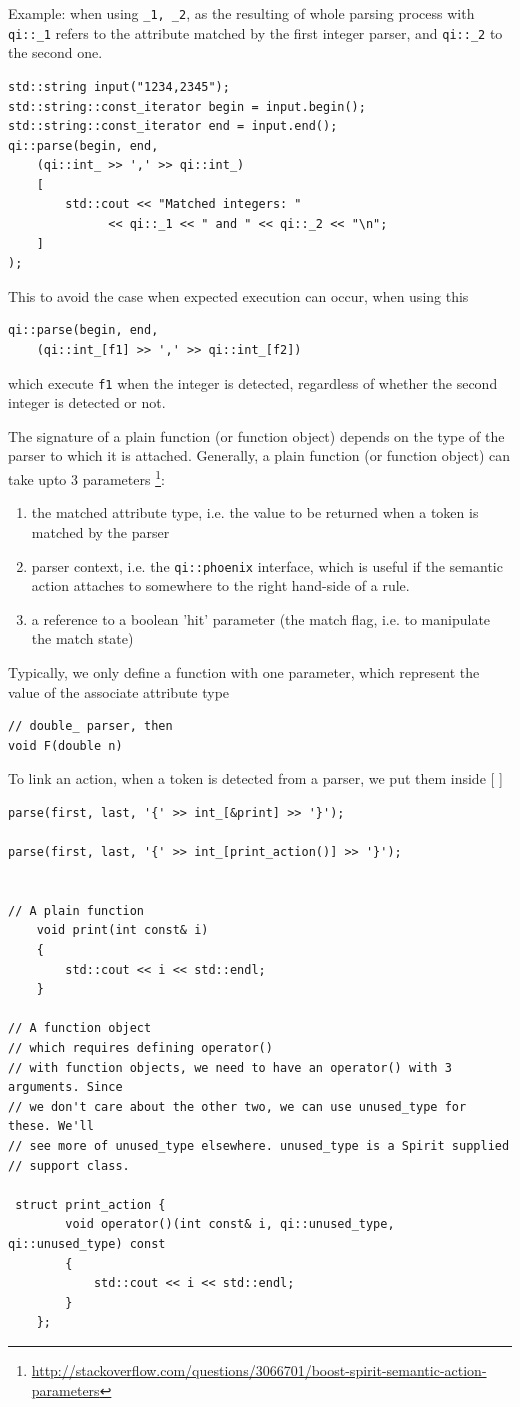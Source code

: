 Example: when using \verb!_1, _2!, as the resulting of whole parsing process
with \verb!qi::_1! refers to the attribute matched by the first integer parser,
and \verb!qi::_2! to the second one.
\begin{verbatim}
std::string input("1234,2345");
std::string::const_iterator begin = input.begin();
std::string::const_iterator end = input.end();
qi::parse(begin, end,
    (qi::int_ >> ',' >> qi::int_)
    [
        std::cout << "Matched integers: "
              << qi::_1 << " and " << qi::_2 << "\n";
    ]
);
\end{verbatim}
This to avoid the case when expected execution can occur, when using this 
\begin{verbatim}
qi::parse(begin, end,
    (qi::int_[f1] >> ',' >> qi::int_[f2])
\end{verbatim}
which execute \verb!f1! when the integer is detected, regardless of whether the
second integer is detected or not.

The signature of a plain function (or function object)  depends on the type of
the parser to which it is attached. Generally, a plain function (or function
object) can take upto 3 parameters
\footnote{\url{http://stackoverflow.com/questions/3066701/boost-spirit-semantic-action-parameters}}:
\begin{enumerate}
  \item the matched attribute type, i.e. the value to be returned when a token
  is matched by the parser
  \item parser context, i.e. the \verb!qi::phoenix! interface, which is useful
  if the semantic action attaches to somewhere to the right hand-side of a rule.
  
  \item a reference to a boolean 'hit' parameter (the match flag, i.e. to
  manipulate the match state)
\end{enumerate}
Typically, we only define a function with one parameter, which represent the
value of the associate attribute type
\begin{verbatim}
// double_ parser, then 
void F(double n)
\end{verbatim}



To link an action, when a token is detected from a parser, we put them inside
[  ]
\begin{verbatim}
parse(first, last, '{' >> int_[&print] >> '}');

parse(first, last, '{' >> int_[print_action()] >> '}');


// A plain function
    void print(int const& i)
    {
        std::cout << i << std::endl;
    }
    
// A function object
// which requires defining operator()
// with function objects, we need to have an operator() with 3 arguments. Since
// we don't care about the other two, we can use unused_type for these. We'll
// see more of unused_type elsewhere. unused_type is a Spirit supplied
// support class.

 struct print_action {
        void operator()(int const& i, qi::unused_type, qi::unused_type) const
        {
            std::cout << i << std::endl;
        }
    };    
\end{verbatim}

